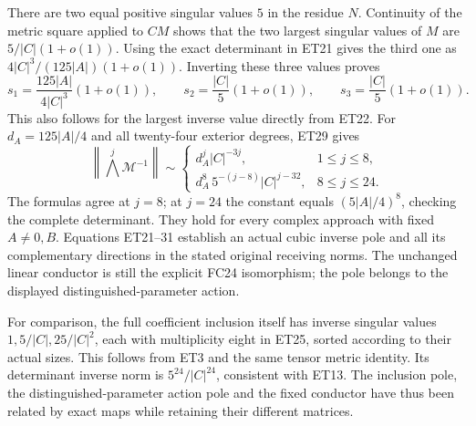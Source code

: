 There are two equal positive singular values $5$ in the residue $N$.
Continuity of the metric square applied to $CM$ shows that the two
largest singular values of $M$ are $5/|C|(1+o(1))$.
Using the exact determinant in ET21 gives the third one as
$4|C|^3/(125|A|)(1+o(1))$. Inverting these three values proves
\[
 s_1=\frac{125|A|}{4|C|^3}(1+o(1)),\qquad
 s_2=\frac{|C|}{5}(1+o(1)),\qquad
 s_3=\frac{|C|}{5}(1+o(1)).
 \tag{ET30}
\]
This also follows for the largest inverse value directly from ET22.
For $d_A=125|A|/4$ and all twenty-four exterior degrees, ET29 gives
\[
 \left\|\bigwedge^j\mathcal M^{-1}\right\|\sim
 \begin{cases}
 d_A^j|C|^{-3j},&1\le j\le8,\\
 d_A^8\,5^{-(j-8)}|C|^{j-32},&8\le j\le24.
 \end{cases}
 \tag{ET31}
\]
The formulas agree at $j=8$; at $j=24$ the constant equals
$(5|A|/4)^8$, checking the complete determinant.
They hold for every complex approach with fixed $A\ne0,B$.
Equations ET21--31 establish an actual cubic inverse pole and all its
complementary directions in the stated original receiving norms.
The unchanged linear conductor is still the explicit FC24 isomorphism;
the pole belongs to the displayed distinguished-parameter action.

For comparison, the full coefficient inclusion itself has inverse
singular values $1,5/|C|,25/|C|^2$, each with multiplicity eight in
ET25, sorted according to their actual sizes. This follows from ET3
and the same tensor metric identity. Its determinant inverse norm is
$5^{24}/|C|^{24}$, consistent with ET13. The inclusion pole, the
distinguished-parameter action pole and the fixed conductor have thus
been related by exact maps while retaining their different matrices.

